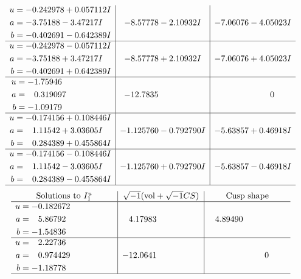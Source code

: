 \documentclass[1p]{elsarticle_modified}
\theoremstyle{definition}
\newcommand{\I}{\sqrt{-1}}
\begin{document}
$$\begin{array}{c|c|c}
\begin{aligned}
u &= -0.242978 + 0.057112 I \\
a &= -3.75188 - 3.47217 I \\
b &= -0.402691 - 0.642389 I\end{aligned}
 & -8.57778 - 2.10932 I & -7.06076 - 4.05023 I \\ \hline\begin{aligned}
u &= -0.242978 - 0.057112 I \\
a &= -3.75188 + 3.47217 I \\
b &= -0.402691 + 0.642389 I\end{aligned}
 & -8.57778 + 2.10932 I & -7.06076 + 4.05023 I \\ \hline\begin{aligned}
u &= -1.75946\phantom{ +0.000000I} \\
a &= \phantom{-}0.319097\phantom{ +0.000000I} \\
b &= -1.09179\phantom{ +0.000000I}\end{aligned}
 & -12.7835\phantom{ +0.000000I} & \phantom{-0.000000 } 0 \\ \hline\begin{aligned}
u &= -0.174156 + 0.108446 I \\
a &= \phantom{-}1.11542 + 3.03605 I \\
b &= \phantom{-}0.284389 + 0.455864 I\end{aligned}
 & -1.125760 - 0.792790 I & -5.63857 + 0.46918 I \\ \hline\begin{aligned}
u &= -0.174156 - 0.108446 I \\
a &= \phantom{-}1.11542 - 3.03605 I \\
b &= \phantom{-}0.284389 - 0.455864 I\end{aligned}
 & -1.125760 + 0.792790 I & -5.63857 - 0.46918 I\\
 \hline 
 \end{array}$$\newpage$$\begin{array}{c|c|c}  
\text{Solutions to }I^u_{1}& \I (\text{vol} + \sqrt{-1}CS) & \text{Cusp shape}\\
 \hline 
\begin{aligned}
u &= -0.182672\phantom{ +0.000000I} \\
a &= \phantom{-}5.86792\phantom{ +0.000000I} \\
b &= -1.54836\phantom{ +0.000000I}\end{aligned}
 & \phantom{-}4.17983\phantom{ +0.000000I} & \phantom{-}4.89490\phantom{ +0.000000I} \\ \hline\begin{aligned}
u &= \phantom{-}2.22736\phantom{ +0.000000I} \\
a &= \phantom{-}0.974429\phantom{ +0.000000I} \\
b &= -1.18778\phantom{ +0.000000I}\end{aligned}
 & -12.0641\phantom{ +0.000000I} & \phantom{-0.000000 } 0\\
 \hline 
 \end{array}$$\newpage\newpage\renewcommand{\arraystretch}{1}
\end{document}
